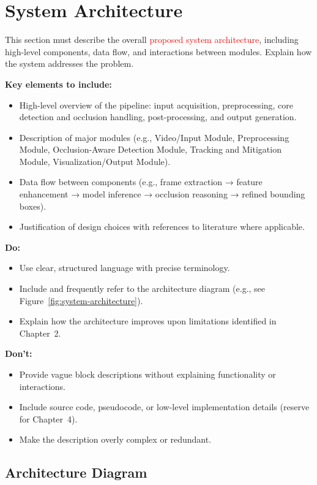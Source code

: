 \documentclass[12pt,a4paper]{report}
\theoremstyle{definition}
\theoremstyle{remark}
\begin{document}
\section{System Architecture}
\label{sec:system-architecture}

This section must describe the overall \textcolor{red}{proposed system architecture}, including high-level components, data flow, and interactions between modules. Explain how the system addresses the problem.

\noindent \textbf{Key elements to include:}
\begin{itemize}
    \item High-level overview of the pipeline: input acquisition, preprocessing, core detection and occlusion handling, post-processing, and output generation.
    \item Description of major modules (e.g., Video/Input Module, Preprocessing Module, Occlusion-Aware Detection Module, Tracking and Mitigation Module, Visualization/Output Module).
    \item Data flow between components (e.g., frame extraction → feature enhancement → model inference → occlusion reasoning → refined bounding boxes).
    \item Justification of design choices with references to literature where applicable.
\end{itemize}

\noindent \textbf{Do:}
\begin{itemize}
    \item Use clear, structured language with precise terminology.
    \item Include and frequently refer to the architecture diagram (e.g., see Figure~\ref{fig:system-architecture}).
    \item Explain how the architecture improves upon limitations identified in Chapter~2.
\end{itemize}

\noindent \textbf{Don’t:}
\begin{itemize}
    \item Provide vague block descriptions without explaining functionality or interactions.
    \item Include source code, pseudocode, or low-level implementation details (reserve for Chapter~4).
    \item Make the description overly complex or redundant.
\end{itemize}

\subsection{Architecture Diagram}
\label{subsec:architecture-diagram}
\end{document}
